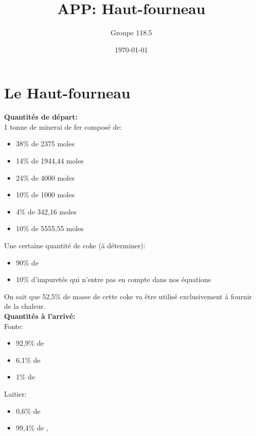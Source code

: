 \documentclass[11pt,a4paper]{report}
\author{Groupe 118.5}
\title{APP: Haut-fourneau}
\date{\today}
\begin{document}
\maketitle

\chapter{Le Haut-fourneau}
\textbf{Quantités de départ:}\\

1 tonne de minerai de fer composé de:
\begin{itemize}
\item{38\% de \chemical{->} 2375 moles}
\item{14\% de \chemical{->} 1944,44 moles}
\item{24\% de \chemical{->}  4000 moles}
\item{10\% de \chemical{->} 1000 moles}
\item{4\% de \chemical{->} 342,16 moles}
\item{10\% de \chemical{->} 5555,55 moles}\\
\end{itemize}


Une certaine quantité de coke (à déterminer):
\begin{itemize}
\item{90\% de }
\item{10\% d'impuretés qui n'entre pas en compte dans nos équations}
\end{itemize}
On sait que 52,5\% de masse de cette coke va être utilisé exclusivement à fournir de la chaleur.\\

\textbf{Quantités à l'arrivé:}\\

Fonte:
\begin{itemize}
\item{92,9\% de }
\item{6,1\% de }
\item{1\% de }\\
\end{itemize}

Laitier:
\begin{itemize}
\item{0,6\% de }
\item{99,4\% de , }\\
\end{itemize}
\end{document}
